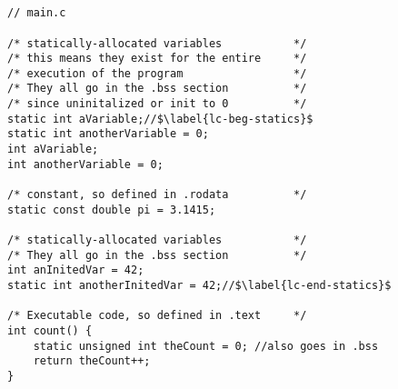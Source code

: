 {
\chapter{}\label{code:c-to-segments}
\begin{listing}[H]
	\begin{verbatim}
// main.c

/* statically-allocated variables       	*/
/* this means they exist for the entire 	*/
/* execution of the program             	*/
/* They all go in the .bss section 			*/
/* since uninitalized or init to 0 			*/
static int aVariable;//$\label{lc-beg-statics}$
static int anotherVariable = 0;
int aVariable;
int anotherVariable = 0;

/* constant, so defined in .rodata		 	*/
static const double pi = 3.1415;

/* statically-allocated variables       	*/
/* They all go in the .bss section 			*/
int anInitedVar = 42;
static int anotherInitedVar = 42;//$\label{lc-end-statics}$

/* Executable code, so defined in .text 	*/
int count() {
	static unsigned int theCount = 0; //also goes in .bss 
	return theCount++;
}
	\end{verbatim}
\end{listing}

}